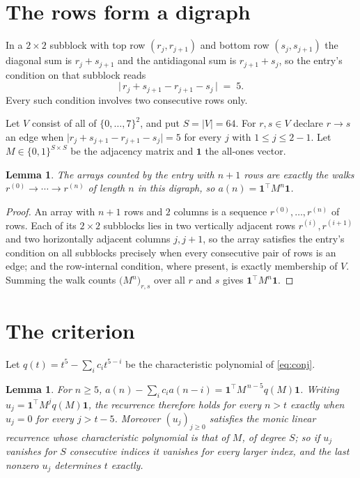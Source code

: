 \documentclass[11pt,a4paper]{article}
\theoremstyle{plain}
\newtheorem{lemma}[theorem]{Lemma}
\theoremstyle{definition}
\begin{document}
\section{The rows form a digraph}

In a $2\times2$ subblock with top row $(r_j,r_{j+1})$ and bottom row $(s_j,s_{j+1})$ the
diagonal sum is $r_j+s_{j+1}$ and the antidiagonal sum is $r_{j+1}+s_j$, so the entry's
condition on that subblock reads
\[
\bigl|\,r_j+s_{j+1}-r_{j+1}-s_j\,\bigr|\;=\;5.
\]
Every such condition involves two consecutive rows only.

Let $V$ consist of all of $\{0,\dots,7\}^{2}$, and put $S=|V|=64$. For $r,s\in V$ declare $r\to s$ an edge
when $\bigl|r_j+s_{j+1}-r_{j+1}-s_j\bigr|=5$ for every $j$ with
$1\le j\le2-1$. Let $M\in\{0,1\}^{S\times S}$ be the adjacency matrix and $\mathbf{1}$
the all-ones vector.

\begin{lemma}\label{lem:walk}
The arrays counted by the entry with $n+1$ rows are exactly the walks
$r^{(0)}\to\cdots\to r^{(n)}$ of length $n$ in this digraph, so
$a(n)=\mathbf{1}^{\!\top}M^{n}\mathbf{1}$.
\end{lemma}

\begin{proof}
An array with $n+1$ rows and $2$ columns is a sequence $r^{(0)},\dots,r^{(n)}$ of
rows. Each of its $2\times2$ subblocks lies in two vertically adjacent rows
$r^{(i)},r^{(i+1)}$ and two horizontally adjacent columns $j,j+1$, so the array satisfies
the entry's condition on all subblocks precisely when every consecutive pair of rows is an
edge; and the row-internal condition, where present, is exactly membership of $V$. Summing
the walk counts $\bigl(M^{n}\bigr)_{r,s}$ over all $r$ and $s$ gives
$\mathbf{1}^{\!\top}M^{n}\mathbf{1}$.
\end{proof}

\section{The criterion}

Let $q(t)=t^{5}-\sum_i c_i t^{5-i}$ be the characteristic polynomial of
\eqref{eq:conj}.

\begin{lemma}\label{lem:crit}
For $n\ge5$,
$a(n)-\sum_i c_i a(n-i)=\mathbf{1}^{\!\top}M^{\,n-5}q(M)\mathbf{1}$. Writing
$u_j=\mathbf{1}^{\!\top}M^{j}q(M)\mathbf{1}$, the recurrence therefore holds for every
$n>t$ exactly when $u_j=0$ for every $j>t-5$. Moreover $(u_j)_{j\ge0}$ satisfies the
monic linear recurrence whose characteristic polynomial is that of $M$, of degree $S$; so
if $u_j$ vanishes for $S$ consecutive indices it vanishes for every larger index, and the
last nonzero $u_j$ determines $t$ exactly.
\end{lemma}
\end{document}
